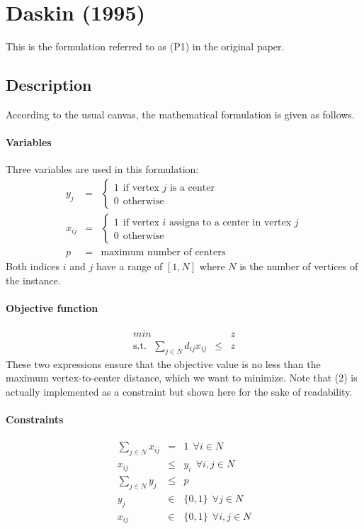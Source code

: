 \documentclass[a4paper,10pt]{article}
\begin{document}
\section{Daskin (1995)}
	This is the formulation referred to as (P1) in the original paper.
	
	\subsection{Description}
	According to the usual canvas, the mathematical formulation is given as follows.
	\paragraph{Variables} Three variables are used in this formulation:
	\begin{eqnarray*}
		y_j &=& \begin{cases}
 				1 ~~\text{if vertex $j$ is a center} \\
 				0 ~~\text{otherwise}
 			\end{cases} \\
 		x_{ij} &=& \begin{cases}
 				1 ~~\text{if vertex $i$ assigns to a center in vertex $j$} \\
 				0 ~~\text{otherwise}
 			\end{cases} \\
 		p &=& \text{maximum number of centers}
	\end{eqnarray*}
	Both indices $i$ and $j$ have a range of $[1, N]$ where $N$ is the number of vertices of the instance. 
	
	\paragraph{Objective function}
	\begin{eqnarray}
		min && z\\
		\text{s.t.}~~~ \sum_{j \in N} d_{ij} x_{ij} &\leq& z 
	\end{eqnarray}
	These two expressions ensure that the objective value is no less than the maximum vertex-to-center distance, which we want to minimize. Note that (2) is actually implemented as a constraint but shown here for the sake of readability.
	
	\paragraph{Constraints}
	\begin{eqnarray}
		\sum_{j \in N} x_{ij} &=& 1 ~~\forall i \in N \\
		x_{ij} &\leq& y_i ~~\forall i,j \in N \\
		\sum_{j \in N} y_j &\leq& p \\
		y_j &\in& \{ 0,1 \} ~~\forall j \in N \\
		x_{ij} &\in& \{0 , 1 \} ~~\forall i,j \in N 
	\end{eqnarray}
	
\end{document}
